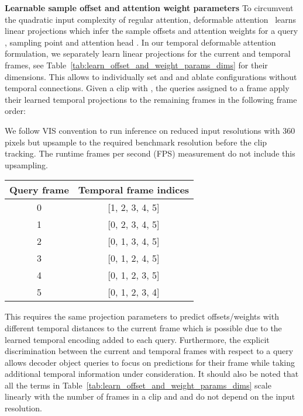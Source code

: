 \documentclass[runningheads]{llncs}
\begin{document}
\noindent \textbf{Learnable sample offset and attention weight parameters}
To circumvent the quadratic input complexity of regular attention, deformable attention~\cite{deformable_detr} learns linear projections which infer the sample offsets  and attention weights  for a query , sampling point  and attention head .
In our temporal deformable attention formulation, we separately learn linear projections for the current and temporal frames, see Table~\ref{tab:learn_offset_and_weight_params_dims} for their dimensions.
This allows to individually set  and  and ablate configurations without temporal connections.
Given a clip with , the queries assigned to a frame  apply their  learned temporal projections to the remaining frames in the following frame order:

We follow VIS convention to run inference on reduced input resolutions with 360 pixels but upsample to the required benchmark resolution before the clip tracking.
The runtime frames per second (FPS) measurement do not include this upsampling.


\begin{table}
\centering
\begin{tabular}{c | c}
    Query frame  & Temporal frame indices \\
    \midrule
    0 & [1, 2, 3, 4, 5] \\
    1 & [0, 2, 3, 4, 5] \\
    2 & [0, 1, 3, 4, 5] \\
    3 & [0, 1, 2, 4, 5] \\
    4 & [0, 1, 2, 3, 5] \\
    5 & [0, 1, 2, 3, 4]
\end{tabular}

\end{table}


This requires the same projection parameters to predict offsets/weights with different temporal distances to the current frame which is possible due to the learned temporal encoding added to each query.
Furthermore, the explicit discrimination between the current and temporal frames with respect to a query allows decoder object queries to focus on predictions for their frame while taking additional temporal information under consideration.
It should also be noted that all the terms in Table~\ref{tab:learn_offset_and_weight_params_dims} scale linearly with the number of frames in a clip and and do not depend on the input resolution.
\end{document}
